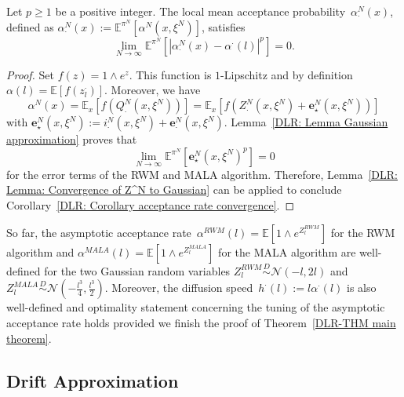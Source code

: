 \begin{cor}\autocite[Corollary 4.6]{Pillai2012}
  \label{DLR: Corollary acceptance rate convergence}
 Let $p \geq 1$ be a positive integer. The local mean acceptance probability~$\alpha^N_{\cdot}(x)$, defined as $\alpha^N_{\cdot}(x) := \mathbb{E}^{\pi^N} \left[ \alpha^N(x, \xi^N) \right]$, satisfies
 \begin{equation*}
   \lim_{N \to \infty}\mathbb{E}^{\pi^N} \left[ |\alpha^N_{\cdot}(x) - \alpha^{\cdot}(l)|^p \right] = 0.
 \end{equation*}

\end{cor}

\begin{proof}
  Set $f(z) = 1 \wedge e^z$. This function is $1$-Lipschitz and by definition~$\alpha(l) = \mathbb{E}[f(z_l^{\cdot})]$. Moreover, we have
  \begin{equation*}
    \alpha^N(x) = \mathbb{E}_x[f(Q^N_{\cdot}(x, \xi^N))] = \mathbb{E}_x[f( Z^N_{\cdot}(x, \xi^N) + \textbf{e}^N_{\star}(x, \xi^N) )]
  \end{equation*}
  with $\textbf{e}^N_{\star}(x, \xi^N) := i_{\cdot}^N(x, \xi^N) + \textbf{e}^N_{\cdot}(x, \xi^N)$. Lemma~\ref{DLR: Lemma Gaussian approximation} proves that 
  \begin{equation*}
   \lim_{N \to \infty}\mathbb{E}^{\pi^N}[ \textbf{e}^N_{\star}(x, \xi^N)^p] =0
  \end{equation*}
  for the error terms of the RWM and MALA algorithm. Therefore, Lemma~\ref{DLR: Lemma: Convergence of Z^N to Gaussian} can be applied to conclude Corollary~\ref{DLR: Corollary acceptance rate convergence}.

\end{proof}

So far, the asymptotic acceptance rate~$\alpha^{RWM}(l) = \mathbb{E}[1 \wedge e^{Z_l^{RWM}}]$ for the RWM algorithm and $\alpha^{MALA}(l) = \mathbb{E}[1 \wedge e^{Z_l^{MALA}}]$ for the MALA algorithm are well-defined for the two Gaussian random variables $Z_l^{RWM} \stackrel{D}{\sim} \mathcal{N}(- l, 2l)$ and $ Z_l^{MALA} \stackrel{D}{\sim} \mathcal{N}(- \tfrac{l^3}{4}, \tfrac{l^3}{2})$. Moreover, the diffusion speed~$h^{\cdot}(l) := l \alpha^{\cdot}(l)$ is also well-defined and optimality statement concerning the tuning of the asymptotic acceptance rate holds provided we finish the proof of Theorem~\ref{DLR-THM main theorem}.




\subsection{Drift Approximation}
\label{sec:sub:DLR - Drift Approximation}


